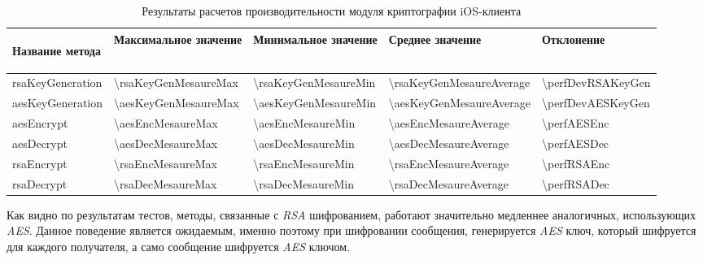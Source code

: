 \begin{table}[!ht]
  \caption{Результаты расчетов производительности модуля криптографии iOS-клиента}
  \label{sec:eng:performance:aesenc:result}
  \centering
  \begin{tabularx}{\linewidth}{
    |>{\hsize=1.85\hsize}X|
    >{\centering\arraybackslash\hsize=1.05\hsize}X|
    >{\centering\arraybackslash\hsize=1.05\hsize}X|
    >{\centering\arraybackslash\hsize=1.05\hsize}X|
    >{\centering\arraybackslash\hsize=0.25\hsize}X|
  }
	\hline
 \begin{center}Название метода\end{center} & Максимальное значение &  Минимальное значение & Среднее значение & Отклонение \\
 \hline
 rsaKeyGeneration & \num{\rsaKeyGenMesaureMax} & \num{\rsaKeyGenMesaureMin} & \num{\rsaKeyGenMesaureAverage} & \num{\perfDevRSAKeyGen} \\
 \hline
 aesKeyGeneration & \num{\aesKeyGenMesaureMax} & \num{\aesKeyGenMesaureMin} & \num{\aesKeyGenMesaureAverage} & \num{\perfDevAESKeyGen} \\
 \hline
 aesEncrypt & \num{\aesEncMesaureMax} & \num{\aesEncMesaureMin} & \num{\aesEncMesaureAverage} & \num{\perfAESEnc} \\
 \hline
 aesDecrypt & \num{\aesDecMesaureMax} & \num{\aesDecMesaureMin} & \num{\aesDecMesaureAverage} & \num{\perfAESDec} \\
 \hline
 rsaEncrypt & \num{\rsaEncMesaureMax} & \num{\rsaEncMesaureMin} & \num{\rsaEncMesaureAverage} & \num{\perfRSAEnc} \\
 \hline
 rsaDecrypt & \num{\rsaDecMesaureMax} & \num{\rsaDecMesaureMin} & \num{\rsaDecMesaureAverage} & \num{\perfRSADec} \\
 \hline
\end{tabularx}
\end{table}

Как видно по результатам тестов, методы, связанные с \textit{RSA} шифрованием, работают значительно медленнее аналогичных, использующих \textit{AES}. Данное поведение является ожидаемым, именно поэтому при шифровании сообщения, генерируется \textit{AES} ключ, который шифруется для каждого получателя, а само сообщение шифруется \textit{AES} ключом.